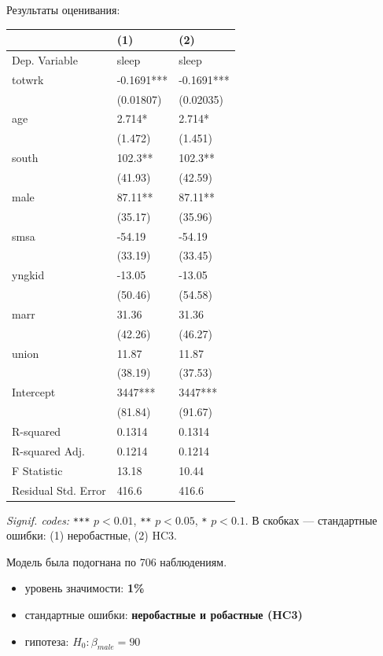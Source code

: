 \documentclass[
  russian,
]{article}
\newcounter{none} %
\providecommand{\tightlist}{%
  \setlength{\itemsep}{0pt}\setlength{\parskip}{0pt}}
\begin{document}
Результаты оценивания:

{\def\LTcaptype{none} %
\begin{longtable}[]{@{}lll@{}}
\toprule\noalign{}
& (1) & (2) \\
\midrule\noalign{}
\endhead
\bottomrule\noalign{}
\endlastfoot
Dep. Variable & sleep & sleep \\
totwrk & -0.1691*** & -0.1691*** \\
& (0.01807) & (0.02035) \\
age & 2.714* & 2.714* \\
& (1.472) & (1.451) \\
south & 102.3** & 102.3** \\
& (41.93) & (42.59) \\
male & 87.11** & 87.11** \\
& (35.17) & (35.96) \\
smsa & -54.19 & -54.19 \\
& (33.19) & (33.45) \\
yngkid & -13.05 & -13.05 \\
& (50.46) & (54.58) \\
marr & 31.36 & 31.36 \\
& (42.26) & (46.27) \\
union & 11.87 & 11.87 \\
& (38.19) & (37.53) \\
Intercept & 3447*** & 3447*** \\
& (81.84) & (91.67) \\
R-squared & 0.1314 & 0.1314 \\
R-squared Adj. & 0.1214 & 0.1214 \\
F Statistic & 13.18 & 10.44 \\
Residual Std. Error & 416.6 & 416.6 \\
\end{longtable}
}

\emph{Signif. codes:} \texttt{***} \(p<0.01\), \texttt{**} \(p<0.05\),
\texttt{*} \(p<0.1\). В скобках --- стандартные ошибки: (1) неробастные,
(2) HC3.

Модель была подогнана по 706 наблюдениям.

\begin{tcolorbox}[enhanced jigsaw, arc=.35mm, bottomrule=.15mm, bottomtitle=1mm, breakable, colback=white, colbacktitle=quarto-callout-important-color!10!white, colframe=quarto-callout-important-color-frame, coltitle=black, left=2mm, leftrule=.75mm, opacityback=0, opacitybacktitle=0.6, rightrule=.15mm, title=\textcolor{quarto-callout-important-color}{\faExclamation}\hspace{0.5em}{Условия теста}, titlerule=0mm, toprule=.15mm, toptitle=1mm]

\begin{itemize}
\tightlist
\item
  уровень значимости: \textbf{1\%}
\item
  стандартные ошибки: \textbf{неробастные и робастные (HC3)}
\item
  гипотеза: \(H_0:\beta_{male}=90\)
\end{itemize}

\end{tcolorbox}
\end{document}
